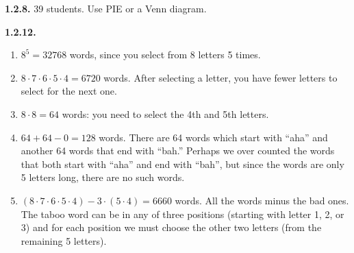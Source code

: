\documentclass[12pt,]{book}
\theoremstyle{plain}
\theoremstyle{definition}
\theoremstyle{definition}
\theoremstyle{definition}
\numberwithin{equation}{chapter}
\begin{document}
\noindent\textbf{1.2.8.} \hypertarget{p-801}{}%
39 students.  Use PIE or a Venn diagram.%
\par\smallskip
\noindent\textbf{1.2.12.} \hypertarget{p-812}{}%
\leavevmode%
\begin{enumerate}[label=(\alph*)]
\item\hypertarget{li-374}{}\(8^5 = 32768\) words, since you select from 8 letters 5 times.%
\item\hypertarget{li-375}{}\(8\cdot 7\cdot 6\cdot 5\cdot 4 = 6720\) words. After selecting a letter, you have fewer letters to select for the next one.%
\item\hypertarget{li-376}{}\hypertarget{p-813}{}%
\(8 \cdot 8 =64\) words: you need to select the 4th and 5th letters.%
\item\hypertarget{li-377}{}\(64 + 64 - 0 = 128\) words. There are 64 words which start with ``aha'' and another 64 words that end with ``bah.'' Perhaps we over counted the words that both start with ``aha'' and end with ``bah'', but since the words are only 5 letters long, there are no such words.%
\item\hypertarget{li-378}{}\((8\cdot 7\cdot 6\cdot 5\cdot 4) - 3\cdot (5\cdot 4) = 6660\) words. All the words minus the bad ones. The taboo word can be in any of three positions (starting with letter 1, 2, or 3) and for each position we must choose the other two letters (from the remaining 5 letters).%
\end{enumerate}
%
\par\smallskip
\end{document}
